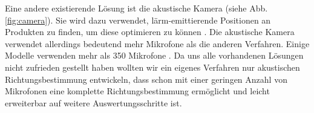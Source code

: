   Eine andere existierende Lösung ist die akustische Kamera (siehe Abb. \ref{fig:camera}). Sie wird dazu verwendet, lärm-emittierende Positionen an Produkten zu finden, um diese optimieren zu können \cite{camera}. Die akustische Kamera verwendet allerdings bedeutend mehr Mikrofone als die anderen Verfahren. Einige Modelle verwenden mehr als 350 Mikrofone \cite{nmics}. Da uns alle vorhandenen Lösungen nicht zufrieden gestellt haben wollten wir ein eigenes Verfahren nur akustischen Richtungsbestimmung entwickeln, dass schon mit einer geringen Anzahl von Mikrofonen eine komplette Richtungsbestimmung ermöglicht und leicht erweiterbar auf weitere Auswertungsschritte ist.
